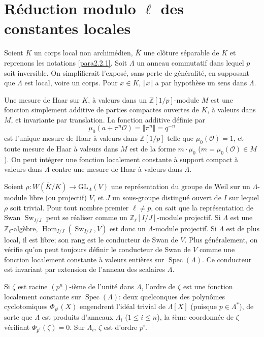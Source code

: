 \documentclass[11pt,a4paper]{amsart}
\theoremstyle{plain}
\theoremstyle{definition}
\DeclareMathOperator{\Hom}{Hom}
\DeclareMathOperator{\Spec}{Spec}
\DeclareMathOperator{\Sw}{Sw}
\newcommand{\dbZ}{\mathbb{Z}}
\newcommand{\GL}{\mathrm{GL}}
\newenvironment{para}{\par\noindent}{\par}
\newcommand{\scrO}{\mathscr{O}}
\newcommand{\ov}[1]{\overline{#1}}
\newcommand{\vl}{\Vert}
\newcommand{\vr}{\Vert}
\begin{document}
\section{R\'eduction modulo $\ell$ des constantes locales}

Soient $K$ un corps local non archim\'edien, $\ov{K}$ une cl\^oture s\'eparable de $K$ et reprenons les notations \ref{para2.2.1}. Soit $\Lambda$ un anneau commutatif dans lequel $p$ soit inversible. On simplifierait l'expos\'e, sans perte de g\'en\'eralit\'e, en supposant que $\Lambda$ est local, voire un corps. Pour $x \in K$, $\vl x \vr$ a par hypoth\`ese un sens dans $\Lambda$.

\begin{para}
Une mesure de Haar sur $K$, \`a valeurs dans un $\dbZ[1/p]$-module $M$ est une fonction simplement additive de parties compactes ouvertes de $K$, \`a valeurs dans $M$, et invariante par translation. La fonction additive d\'efinie par
\[
\mu_{0}(a + \pi^{n}\scrO) = \vl \pi^{n} \vr = q^{-n}
\]
est l'unique mesure de Haar \`a valeurs dans $\dbZ[1/p]$ telle que $\mu_{0}(\scrO) = 1$, et toute mesure de Haar \`a valeurs dans $M$ est de la forme $m \cdot \mu_{0}$ ($m = \mu_{0}(\scrO) \in M$). On peut int\'egrer une fonction localement constante \`a support compact \`a valeurs dans $\Lambda$ contre une mesure de Haar \`a valeurs dans $\Lambda$.
\end{para}

\begin{para}
Soient $\rho: W(\ov{K}/K) \to \GL_{\Lambda}(V)$ une repr\'esentation du groupe de Weil sur un $\Lambda$-module libre (ou projectif) $V$, et $J$ un sous-groupe distingu\'e ouvert de $I$ sur lequel $\rho$ soit trivial. Pour tout nombre premier $\ell \not= p$, on sait que la repr\'esentation de Swan $\Sw_{I/J}$ peut se r\'ealiser comme un $\dbZ_{\ell}[I/J]$-module projectif. Si $\Lambda$ est une $\dbZ_{\ell}$-alg\`ebre, $\Hom_{I/J}(\Sw_{I/J}, V)$ est donc un $\Lambda$-module projectif. Si $\Lambda$ est de plus local, il est libre; son rang est le conducteur de Swan de $V$. Plus g\'en\'eralement, on v\'erifie qu'on peut toujours d\'efinir le conducteur de Swan de $V$ comme une fonction localement constante \`a valeurs enti\`eres sur $\Spec(\Lambda)$. Ce conducteur est invariant par extension de l'anneau des scalaires $\Lambda$.
\end{para}

\begin{para}
Si $\zeta$ est racine $(p^{n})$-i\`eme de l'unit\'e dans $\Lambda$, l'ordre de $\zeta$ est une fonction localement constante sur $\Spec(\Lambda)$: deux quelconques des polyn\^omes cyclotomiques $\Phi_{p^{i}}(X)$ engendrent l'id\'eal trivial de $\Lambda[X]$ (puisque $p \in \Lambda^{*}$), de sorte que $\Lambda$ est produits d'anneaux $\Lambda_{i}$ ($1 \leq i \leq n$), la $i$\`eme coordonn\'ee de $\zeta$ v\'erifiant $\Phi_{p^{i}}(\zeta) = 0$. Sur $\Lambda_{i}$, $\zeta$ est d'ordre $p^{i}$.
\end{para}
\end{document}
